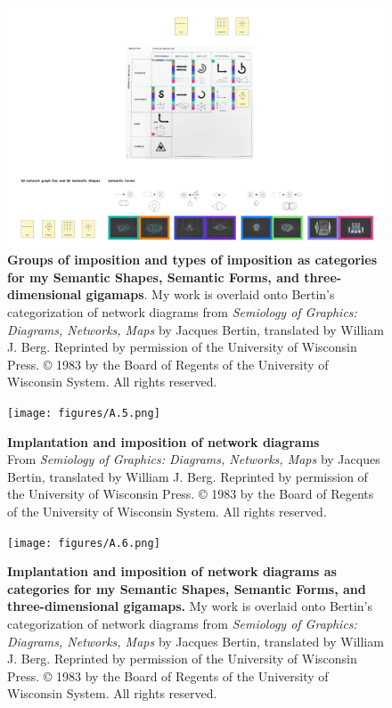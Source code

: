\begin{figure}[h!]
    \centering
    \includegraphics[width=\textwidth]{figures/A.4.png}
    \caption[Groups of imposition and types of imposition as categories for my Semantic Shapes, Semantic Forms, and three-dimensional gigamaps]{\textbf{Groups of imposition and types of imposition as categories for my Semantic Shapes, Semantic Forms, and three-dimensional gigamaps}. My work is overlaid onto Bertin’s categorization of network diagrams \citep[p. 52]{bertin_semiology_2011} from \textit{Semiology of Graphics: Diagrams, Networks, Maps} by Jacques Bertin, translated by William J. Berg. Reprinted by permission of the University of Wisconsin Press. © 1983 by the Board of Regents of the University of Wisconsin System. All rights reserved.}
    \label{fig:A4}
\end{figure}
\begin{figure}[h!]
    \centering
    \texttt{[image: figures/A.5.png]}
    \caption[Implantation and imposition of network diagrams]{\textbf{Implantation and imposition of network diagrams} \citep[p. 270]{bertin_semiology_2011} \\
From \textit{Semiology of Graphics: Diagrams, Networks, Maps} by Jacques Bertin, translated by William J. Berg. Reprinted by permission of the University of Wisconsin Press. © 1983 by the Board of Regents of the University of Wisconsin System. All rights reserved.}
    \label{fig:A5}
\end{figure}
\begin{figure}[h!]
    \centering
    \texttt{[image: figures/A.6.png]}
    \caption[Implantation and imposition of network diagrams as categories for my Semantic Shapes, Semantic Forms, and three-dimensional gigamaps]{\textbf{Implantation and imposition of network diagrams as categories for my Semantic Shapes, Semantic Forms, and three-dimensional gigamaps.} \citep[p. 270]{bertin_semiology_2011} 
My work is overlaid onto Bertin’s categorization of network diagrams \citep[p. 270]{bertin_semiology_2011} from \textit{Semiology of Graphics: Diagrams, Networks, Maps} by Jacques Bertin, translated by William J. Berg. Reprinted by permission of the University of Wisconsin Press. © 1983 by the Board of Regents of the University of Wisconsin System. All rights reserved.
}
    \label{fig:A6}
\end{figure}
\clearpage


